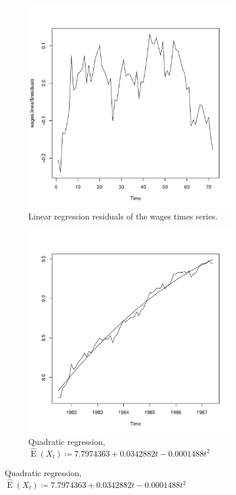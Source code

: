 \documentclass[10pt]{fphw}
\theoremstyle{definition}
\newcommand{\expect}{\operatorname{E}}
\begin{document}
\begin{enumerate}
\begin{figure}
    \begin{subfigure}{.5\textwidth}
    \centering
    \includegraphics[width=.85\textwidth]{plot3_c_lin_resid}
    \caption{Linear regression residuals of the wages times series.}
    \label{fig:plot3c}
    \end{subfigure}
    \begin{subfigure}{.5\textwidth}
    \centering
    \includegraphics[width=.85\linewidth]{plot3_d_qd_fit}
    \caption{Quadratic regression, $\hat{\expect}(X_t) \coloneqq 7.7974363 + 0.0342882 t - 0.0001488 t^2$}
    \label{fig:plot3d}
    \end{subfigure}


\end{figure}
\end{enumerate}
\end{document}
